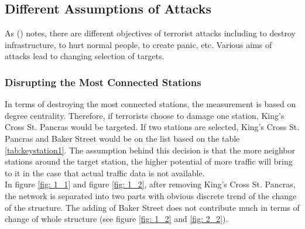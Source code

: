 \documentclass[a4paper,reqno,]{article}
\begin{document}
\subsection{Different Assumptions of Attacks}
\label{ssec:assumptions}
As \citeauthor{jordan2008predicting} (\citeyear{jordan2008predicting}) notes, there are different objectives of terrorist attacks including to destroy infrastructure, to hurt normal people, to create panic, etc. Various aims of attacks lead to changing selection of targets. 
\subsubsection{Disrupting the Most Connected Stations}
In terms of destroying the most connected stations, the measurement is based on degree centrality. Therefore, if terrorists choose to damage one station, King's Cross St. Pancras would be targeted. If two stations are selected, King's Cross St. Pancras and Baker Street would be on the list based on the table \ref{tab:keystation1}. The assumption behind this decision is that the more neighbor stations around the target station, the higher potential of more traffic will bring to it in the case that actual traffic data is not available. 
\\In figure \ref{fig: 1_1} and figure \ref{fig: 1_2}, after removing King's Cross St. Pancras, the network is separated into two parts with obvious discrete trend of the change of the structure. The adding of Baker Street does not contribute much in terms of change of whole structure (see figure \ref{fig: 1_2} and \ref{fig: 2_2}). 
\end{document}
